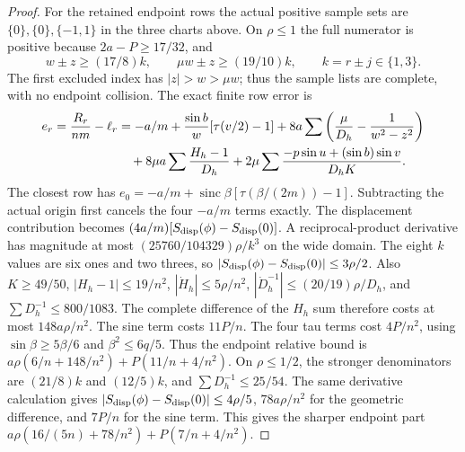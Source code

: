 \begin{proof}
For the retained endpoint rows the actual positive sample sets are
$\{0\},\{0\},\{-1,1\}$ in the three charts above. On $\rho\leq1$ the
full numerator is positive because $2a-P\geq17/32$, and
\[
 w\pm z\geq(17/8)k,\qquad \mu w\pm z\geq(19/10)k,
 \qquad k=r\pm j\in\{1,3\}.
\]
The first excluded index has $|z|>w>\mu w$; thus the sample lists
are complete, with no endpoint collision. The exact finite row error is
\begin{align*}
 e_r=\frac{R_r}{nm}-\ell_r
  &=-a/m+{\sin b\over w}[\tau(v/2)-1]
   +8a\sum\left(\frac\mu{D_h}-\frac1{w^2-z^2}\right)\\
  &\quad+8\mu a\sum\frac{H_h-1}{D_h}
   +2\mu\sum\frac{-p\sin u+(\sin b)\sin v}{D_hK}.
\end{align*}
The closest row has $e_0=-a/m+\operatorname{sinc}\beta
[\tau(\beta/(2m))-1]$. Subtracting the actual origin first cancels
the four $-a/m$ terms exactly. The displacement contribution becomes
$(4a/m)[S_{\rm disp}(\phi)-S_{\rm disp}(0)]$.
A reciprocal-product derivative has magnitude at most
$(25760/104329)\rho/k^3$ on the wide domain. The eight $k$ values
are six ones and two threes, so
$|S_{\rm disp}(\phi)-S_{\rm disp}(0)|\leq3\rho/2$.
Also $K\geq49/50$, $|H_h-1|\leq19/n^2$,
$|\dot H_h|\leq5\rho/n^2$,
$|\dot D_h^{-1}|\leq(20/19)\rho/D_h$, and
$\sum D_h^{-1}\leq800/1083$. The complete difference of the $H_h$
sum therefore costs at most $148a\rho/n^2$.
The sine term costs $11P/n$. The four tau terms cost $4P/n^2$,
using $\sin\beta\geq5\beta/6$ and $\beta^2\leq6q/5$.
Thus the endpoint relative bound is
$a\rho(6/n+148/n^2)+P(11/n+4/n^2)$.
On $\rho\leq1/2$, the stronger denominators are $(21/8)k$ and
$(12/5)k$, and $\sum D_h^{-1}\leq25/54$. The same derivative
calculation gives $|S_{\rm disp}(\phi)-S_{\rm disp}(0)|\leq4\rho/5$,
$78a\rho/n^2$ for the geometric difference, and $7P/n$ for the sine
term. This gives the sharper endpoint part
$a\rho(16/(5n)+78/n^2)+P(7/n+4/n^2)$.


\end{proof}
